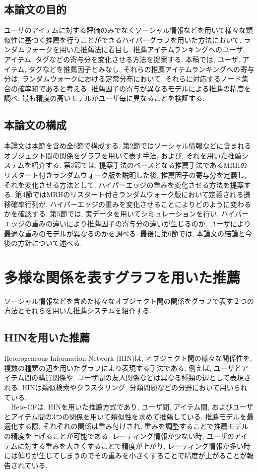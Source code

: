 \documentclass[a4j,11pt]{jarticle}           %
\begin{document}
	\subsection{本論文の目的}
	ユーザのアイテムに対する評価のみでなくソーシャル情報などを用いて様々な類似性に基づく推薦を行うことができるハイパーグラフを用いた方法において, ランダムウォークを用いた推薦法に着目し, 推薦アイテムランキングへのユーザ, アイテム, タグなどの寄与分を変化させる方法を提案する. 本稿では, ユーザ, アイテム, タグなどを推薦因子とみなし, それらの推薦アイテムランキングへの寄与分は, ランダムウォークにおける定常分布において, それらに対応するノード集合の確率和であると考える. 推薦因子の寄与が異なるモデルによる推薦の精度を調べ, 最も精度の高いモデルがユーザ毎に異なることを検証する.	
	\subsection{本論文の構成}
	本論文は本節を含め全6節で構成する. 第2節ではソーシャル情報などに含まれるオブジェクト間の関係をグラフを用いて表す手法, および, それを用いた推薦システムを紹介する. 第3節では, 提案手法のベースとなる推薦手法であるMRHのリスタート付きランダムウォーク版を説明した後, 推薦因子の寄与分を定義し, それを変化させる方法として, ハイパーエッジの重みを変化させる方法を提案する. 第4節ではMRHのリスタート付きランダムウォーク版において定義される遷移確率行列が, ハイパーエッジの重みを変化させることによりどのように変わるかを確認する. 第5節では, 実データを用いてシミュレーションを行い, ハイパーエッジの重みの違いにより推薦因子の寄与分の違いが生じるのか, ユーザにより最適な重みのモデルが異なるのかを調べる. 最後に第6節では, 本論文の結論と今後の方針について述べる. 
	\newpage
	\section{多様な関係を表すグラフを用いた推薦}
	ソーシャル情報などを含めた様々なオブジェクト間の関係をグラフで表す２つの方法とそれらを用いた推薦システムを紹介する.
	\subsection{HINを用いた推薦}
	Heterogeneous Information Network (HIN)\cite{HIN}は, オブジェクト間の様々な関係性を, 複数の種類の辺を用いたグラフにより表現する手法である. 
	例えば, ユーザとアイテム間の購買関係や, ユーザ間の友人関係などは異なる種類の辺として表現される. HINは類似検索やクラスタリング, 分類問題などの分野において用いられている. 
	\\　Hete-CF\cite{Hete}は, HINを用いた推薦方式であり, ユーザ間, アイテム間, およびユーザとアイテム間の3つの関係を用いて類似性を求めて推薦している. 推薦モデルを最適化する際, それぞれの関係は重み付けされ, 重みを調整することで推薦モデルの精度を上げることが可能である. レーティング情報が少ない時, ユーザのアイテムに対する重みを大きくすることで精度が上がり, レーティング情報が多い時には偏りが生じてしまうのでその重みを小さくすることで精度が上がることが報告されている.
\end{document}
